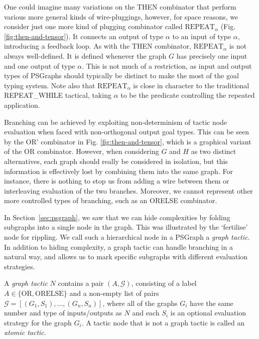 \documentclass{llncs}
\begin{document}
 One could imagine many variations on the THEN combinator that perform various more general kinds of wire-pluggings, however, for space reasons, we consider just one more kind of plugging combinator called $\textrm{REPEAT}_\alpha$
(Fig. \ref{fig:then-and-tensor}). It  connects an output of type $\alpha$ to an input of type $\alpha$, introducing a feedback loop. As with the THEN combinator, $\textrm{REPEAT}_\alpha$ is not always well-defined. It is defined whenever the graph $G$ has precisely one input and one output of type $\alpha$. This is not much of a restriction, as input and output types of PSGraphs should typically be distinct to make the most of the goal typing system. Note also that   $\textrm{REPEAT}_\alpha$ is close in character to the traditional REPEAT\_WHILE tactical,
taking $\alpha$ to be the predicate controlling the repeated application.

Branching can be achieved by exploiting non-determinism of tactic node evaluation when faced with non-orthogonal output goal types.
This can be seen by the OR' combinator in Fig. \ref{fig:then-and-tensor}, which is a graphical variant of the OR combinator. 
However, when considering $G$ and $H$ as two distinct alternatives, each graph should really be considered in isolation, but this information is effectively lost by combining them into the same graph. For instance, there is nothing to stop us from adding a wire between them or interleaving evaluation of the two branches. Moreover, we cannot represent other more controlled types of branching, such as an ORELSE combinator.

In Section~\ref{sec:psgraph}, we saw that we can hide complexities by folding subgraphs into a single node in the graph. 
This was illustrated by the `fertilise' node for rippling. We call such a hierarchical node in a PSGraph a \emph{graph tactic}.
In addition to hiding complexity, a graph tactic can handle branching in a natural way, and allows us to mark specific subgraphs with different evaluation strategies. 

\begin{definition}\label{def:graph-tactic} \rm
  A \textit{graph tactic} $N$ contains a pair $(A, \mathcal G)$, consisting of a label $A \in \{ \textrm{OR}, \textrm{ORELSE} \}$ and a non-empty list of pairs $\mathcal G = [(G_1, S_1), \ldots, (G_n, S_n)]$, where all of the graphs $G_i$ have the same number and type of inputs/outputs as $N$ and each $S_i$ is an optional evaluation strategy for the graph $G_i$.  A tactic node that is not a graph tactic is called an \emph{atomic tactic}.
\end{definition}
\end{document}
